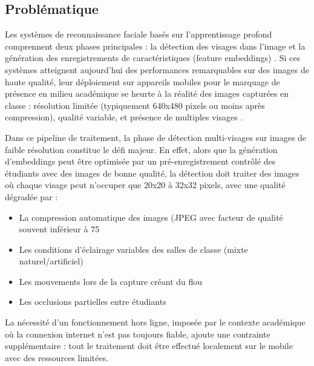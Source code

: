 \begin{onehalfspace}
\section{Problématique}

\hspace{0.65 cm} Les systèmes de reconnaissance faciale basés sur l'apprentissage profond comprennent deux phases principales : la détection des visages dans l'image et la génération des enregistrements de caractéristiques (feature embeddings) \cite{2023Deng12903}. Si ces systèmes atteignent aujourd'hui des performances remarquables sur des images de haute qualité, leur déploiement sur appareils mobiles pour le marquage de présence en milieu académique se heurte à la réalité des images capturées en classe : résolution limitée (typiquement 640x480 pixels ou moins après compression), qualité variable, et présence de multiples visages \cite{2022khabar05572}.

\hspace{0.65 cm} Dans ce pipeline de traitement, la phase de détection multi-visages sur images de faible résolution constitue le défi majeur. En effet, alors que la génération d'embeddings peut être optimisée par un pré-enregistrement contrôlé des étudiants avec des images de bonne qualité, la détection doit traiter des images où chaque visage peut n'occuper que 20x20 à 32x32 pixels, avec une qualité dégradée par :

\begin{itemize}
     \item La compression automatique des images (JPEG avec facteur de qualité souvent inférieur à 75%
     \item Les conditions d'éclairage variables des salles de classe (mixte naturel/artificiel)
     \item Les mouvements lors de la capture créant du flou
     \item Les occlusions partielles entre étudiants
     
\end{itemize}

\hspace{0.65 cm}La nécessité d'un fonctionnement hors ligne, imposée par le contexte académique où la connexion internet n'est pas toujours fiable, ajoute une contrainte supplémentaire : tout le traitement doit être effectué localement sur le mobile avec des ressources limitées.


\end{onehalfspace}
